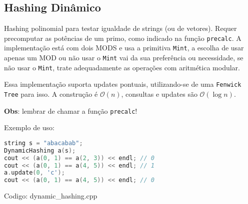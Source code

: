 \documentclass[10pt, a4paper, oneside]{book}
\begin{document}
\subsection{Hashing Dinâmico}


Hashing polinomial para testar igualdade de strings (ou de vetores). Requer precomputar as potências de um primo, como indicado na função \texttt{precalc}. A implementação está com dois MODS e usa a primitiva \texttt{Mint}, a escolha de usar apenas um MOD ou não usar o \texttt{Mint} vai da sua preferência ou necessidade, se não usar o \texttt{Mint}, trate adequadamente as operações com aritmética modular.

Essa implementação suporta updates pontuais, utilizando-se de uma \texttt{Fenwick Tree} para isso. A construção é $\mathcal{O}(n)$, consultas e updates são $\mathcal{O}(\log n)$.



\textbf{Obs}: lembrar de chamar a função \texttt{precalc}!



Exemplo de uso:



\begin{lstlisting}[language=C++]
string s = "abacabab";
DynamicHashing a(s);
cout << (a(0, 1) == a(2, 3)) << endl; // 0
cout << (a(0, 1) == a(4, 5)) << endl; // 1
a.update(0, 'c');
cout << (a(0, 1) == a(4, 5)) << endl; // 0
\end{lstlisting}

\hfill

Codigo: dynamic\_hashing.cpp
\end{document}
